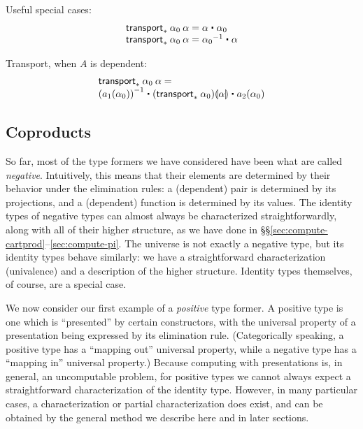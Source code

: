 Useful special cases:
\[
\begin{array}{l}
\transport{x:A \mapsto \id[A] {a}{x}} {\alpha_0} \: {\alpha} = \alpha \ct \alpha_0 \\
\transport{x:A \mapsto \id[A] {x_0}{a}} {\alpha_0} \: {\alpha} = \opp {\alpha_0} \ct \alpha \\
\end{array}
\]

Transport, when $A$ is dependent:
\[
\begin{array}{l}
\transport{x_0:A_0 \mapsto \id[A(x_0)] {a_1(x_0)}{a_2(x_0)}} {\alpha_0} \: {\alpha} = \\
\opp{(\map{a_1}{\alpha_0})} \ct \mapdep{(\transport{A}{\alpha_0})}{\alpha} \ct \map{a_2}{\alpha_0}
\end{array}
\]

\subsection{Coproducts}
\label{sec:compute-coprod}

So far, most of the type formers we have considered have been what are called \emph{negative}.
Intuitively, this means that their elements are determined by their behavior under the elimination rules: a (dependent) pair is determined by its projections, and a (dependent) function is determined by its values.
The identity types of negative types can almost always be characterized straightforwardly, along with all of their higher structure, as we have done in \S\S\ref{sec:compute-cartprod}--\ref{sec:compute-pi}.
The universe is not exactly a negative type, but its identity types behave similarly: we have a straightforward characterization (univalence) and a description of the higher structure.
Identity types themselves, of course, are a special case.

We now consider our first example of a \emph{positive} type former.
A positive type is one which is ``presented'' by certain constructors, with the universal property of a presentation being expressed by its elimination rule.
(Categorically speaking, a positive type has a ``mapping out'' universal property, while a negative type has a ``mapping in'' universal property.)
Because computing with presentations is, in general, an uncomputable problem, for positive types we cannot always expect a straightforward characterization of the identity type.
However, in many particular cases, a characterization or partial characterization does exist, and can be obtained by the general method we describe here and in later sections.

